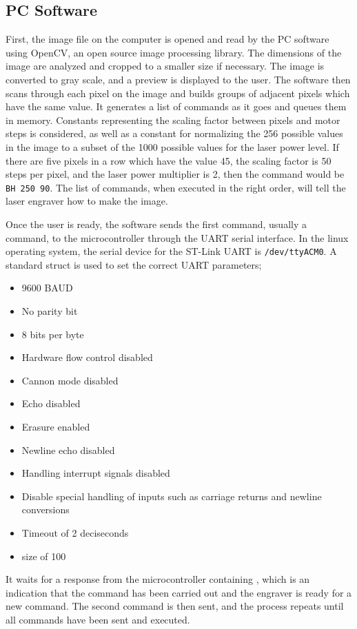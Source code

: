 \documentclass[11pt]{LaTeX-Classes/math-hw}
\begin{document}
\subsection{PC Software}
First, the image file on the computer is opened and read by the PC software using OpenCV, an open source
image processing library. The dimensions of the image are analyzed and cropped to a smaller size
if necessary.
The image is converted to gray scale, and a preview is displayed to the user.
The software then scans through each pixel on the image and builds groups of adjacent pixels
which have the same value. It generates a list of commands as it goes and queues them in memory.
Constants representing the scaling factor between pixels and motor steps is considered, as well
as a constant for normalizing the 256 possible values in the image to a subset of the 1000 possible
values for the laser power level.
If there are five pixels in a row which have the value 45, the scaling factor is 50 steps
per pixel, and the laser power multiplier is 2, then the command would be \texttt{BH 250 90}.
The list of commands, when executed in the right order, will tell the laser engraver how to make the image.

Once the user is ready, the software sends the first command, usually a  command, to the
microcontroller through the UART serial interface.
In the linux operating system, the serial device for the ST-Link UART is \texttt{/dev/ttyACM0}.
A standard  struct is used to set the correct UART parameters;
\begin{itemize}
  \item 9600 BAUD
  \item No parity bit
  \item 8 bits per byte
  \item Hardware flow control disabled
  \item Cannon mode disabled
  \item Echo disabled
  \item Erasure enabled
  \item Newline echo disabled
  \item Handling interrupt signals disabled
  \item Disable special handling of inputs such as carriage returns and newline conversions
  \item Timeout of 2 deciseconds
  \item {} size of 100
\end{itemize}

It waits for a response from the microcontroller containing ,
which is an indication that the command has been
carried out and the engraver is ready for a new command.
The second command is then sent, and the process repeats until all commands have been sent and executed.
\end{document}
